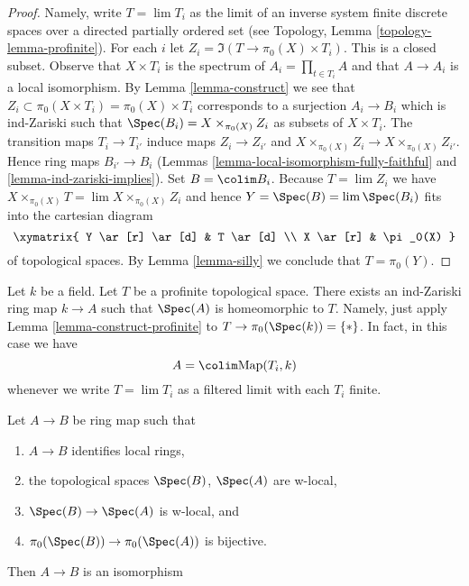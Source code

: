 \begin{proof}
Namely, write $T = \lim T_i$ as the limit of an inverse system finite
discrete spaces over a directed partially ordered set (see
Topology, Lemma \ref{topology-lemma-profinite}). For each $i$ let
$Z_i = \Im(T \to \pi_0(X) \times T_i)$. This is a closed subset.
Observe that $X \times T_i$ is the spectrum of $A_i = \prod_{t \in T_i} A$
and that $A \to A_i$ is a local isomorphism. By Lemma \ref{lemma-construct}
we see that $Z_i \subset \pi_0(X \times T_i) = \pi_0(X) \times T_i$
corresponds to a surjection $A_i \to B_i$ which is ind-Zariski
such that $\Spec(B_i) = X \times_{\pi_0(X)} Z_i$ as subsets of
$X \times T_i$. The transition maps $T_i \to T_{i'}$ induce maps
$Z_i \to Z_{i'}$ and $X \times_{\pi_0(X)} Z_i \to X \times_{\pi_0(X)} Z_{i'}$.
Hence ring maps $B_{i'} \to B_i$
(Lemmas \ref{lemma-local-isomorphism-fully-faithful} and
\ref{lemma-ind-zariski-implies}).
Set $B = \colim B_i$. Because $T = \lim Z_i$ we have
$X \times_{\pi_0(X)} T = \lim  X \times_{\pi_0(X)} Z_i$
and hence $Y = \Spec(B) = \lim \Spec(B_i)$
fits into the cartesian diagram
$$
\xymatrix{
Y \ar[r] \ar[d] & T \ar[d] \\
X \ar[r] & \pi_0(X)
}
$$
of topological spaces. By Lemma \ref{lemma-silly}
we conclude that $T = \pi_0(Y)$.
\end{proof}

\begin{example}
\label{example-construct-space}
Let $k$ be a field. Let $T$ be a profinite topological space.
There exists an ind-Zariski ring map $k \to A$ such that
$\Spec(A)$ is homeomorphic to $T$. Namely, just apply
Lemma \ref{lemma-construct-profinite} to $T \to \pi_0(\Spec(k)) = \{*\}$.
In fact, in this case we have
$$
A = \colim \text{Map}(T_i, k)
$$
whenever we write $T = \lim T_i$ as a filtered limit with each $T_i$ finite.
\end{example}

\begin{lemma}
\label{lemma-w-local-morphism-equal-points-stalks-is-iso}
Let $A \to B$ be ring map such that
\begin{enumerate}
\item $A \to B$ identifies local rings,
\item the topological spaces $\Spec(B)$, $\Spec(A)$ are w-local,
\item $\Spec(B) \to \Spec(A)$ is w-local, and
\item $\pi_0(\Spec(B)) \to \pi_0(\Spec(A))$ is bijective.
\end{enumerate}
Then $A \to B$ is an isomorphism
\end{lemma}

